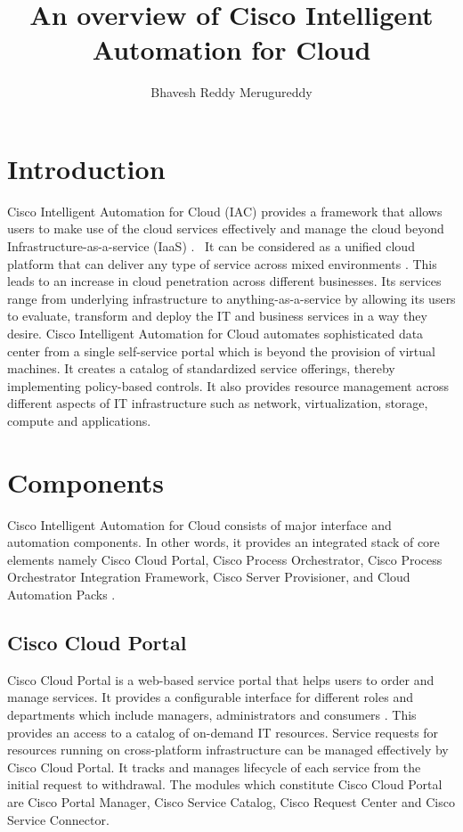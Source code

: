 \documentclass[9pt,twocolumn,twoside]{../../styles/osajnl}
\title{An overview of Cisco Intelligent Automation for Cloud}
\author[1,*]{Bhavesh Reddy Merugureddy}
\affil[1]{School of Informatics and Computing, Bloomington, IN 47408, U.S.A.}
\affil[*]{Corresponding authors: bmerugur@umail.iu.edu}
\begin{document}
\maketitle

\section{Introduction}

Cisco Intelligent Automation for Cloud (IAC) provides a framework that
allows users to make use of the cloud services effectively and manage
the cloud beyond Infrastructure-as-a-service (IaaS)
\cite{ciscolive-introduction}.  It can be considered as a unified
cloud platform that can deliver any type of service across mixed
environments \cite{cisco-wikibon}. This leads to an increase in cloud
penetration across different businesses. Its services range from
underlying infrastructure to anything-as-a-service by allowing its
users to evaluate, transform and deploy the IT and business services
in a way they desire. Cisco Intelligent Automation for Cloud automates
sophisticated data center from a single self-service portal which is
beyond the provision of virtual machines. It creates a catalog of
standardized service offerings, thereby implementing policy-based
controls. It also provides resource management across different
aspects of IT infrastructure such as network, virtualization, storage,
compute and applications.

\section{Components}

Cisco Intelligent Automation for Cloud consists of major interface and
automation components. In other words, it provides an integrated stack
of core elements namely Cisco Cloud Portal, Cisco Process
Orchestrator, Cisco Process Orchestrator Integration Framework, Cisco
Server Provisioner, and Cloud Automation Packs \cite{cisco-datasheet}.

\subsection{Cisco Cloud Portal}

Cisco Cloud Portal is a web-based service portal that helps users to
order and manage services. It provides a configurable interface for
different roles and departments which include managers, administrators
and consumers \cite{cisco-datasheet}. This provides an access to a
catalog of on-demand IT resources. Service requests for resources
running on cross-platform infrastructure can be managed effectively by
Cisco Cloud Portal. It tracks and manages lifecycle of each service
from the initial request to withdrawal. The modules which constitute
Cisco Cloud Portal are Cisco Portal Manager, Cisco Service Catalog,
Cisco Request Center and Cisco Service Connector.
\end{document}

